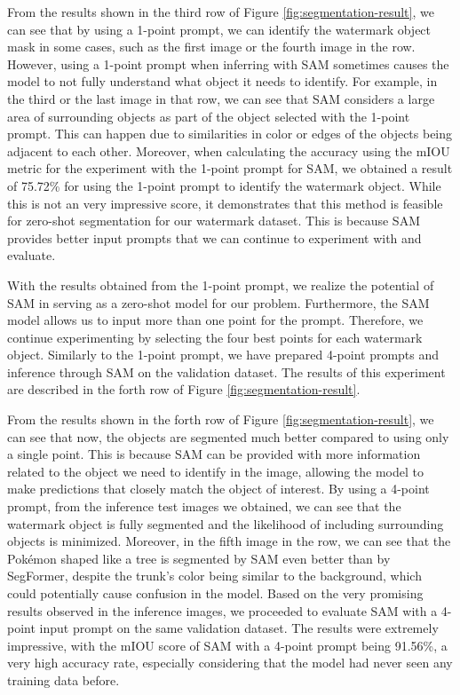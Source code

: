 From the results  shown in the third row of Figure \ref{fig:segmentation-result}, we can see that by using a 1-point prompt, we can identify the watermark object mask in some cases, such as the first image or the fourth image in the row. However, using a 1-point prompt when inferring with SAM sometimes causes the model to not fully understand what object it needs to identify. For example, in the third or the last image in that row, we can see that SAM considers a large area of surrounding objects as part of the object selected with the 1-point prompt. This can happen due to similarities in color or edges of the objects being adjacent to each other. Moreover, when calculating the accuracy using the mIOU metric for the experiment with the 1-point prompt for SAM, we obtained a result of 75.72\% for using the 1-point prompt to identify the watermark object. While this is not an very impressive score, it demonstrates that this method is feasible for zero-shot segmentation for our watermark dataset. This is because SAM provides better input prompts that we can continue to experiment with and evaluate.

With the results obtained from the 1-point prompt, we realize the potential of SAM in serving as a zero-shot model for our problem. Furthermore, the SAM model allows us to input more than one point for the prompt. Therefore, we continue experimenting by selecting the four best points for each watermark object. Similarly to the 1-point prompt, we have prepared 4-point prompts and inference through SAM on the validation dataset. The results of this experiment are described in the forth row of Figure \ref{fig:segmentation-result}.


From the results shown in the forth row of Figure \ref{fig:segmentation-result}, we can see that now, the objects are segmented much better compared to using only a single point. This is because SAM can be provided with more information related to the object we need to identify in the image, allowing the model to make predictions that closely match the object of interest. By using a 4-point prompt, from the inference test images we obtained, we can see that the watermark object is fully segmented and the likelihood of including surrounding objects is minimized. Moreover, in the fifth image in the row, we can see that the Pokémon shaped like a tree is segmented by SAM even better than by SegFormer, despite the trunk's color being similar to the background, which could potentially cause confusion in the model. Based on the very promising results observed in the inference images, we proceeded to evaluate SAM with a 4-point input prompt on the same validation dataset. The results were extremely impressive, with the mIOU score of SAM with a 4-point prompt being 91.56\%, a very high accuracy rate, especially considering that the model had never seen any training data before.

